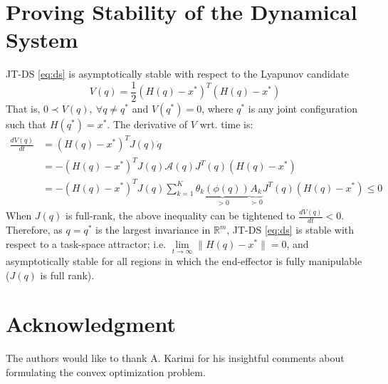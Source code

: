 \documentclass[letterpaper, 10 pt, journal, twoside, fleqn]{IEEEtran}
\begin{document}
{\footnotesize
\appendices
\section{Proving Stability of the Dynamical System}
\label{appendix:stability}
JT-DS \eqref{eq:ds} is asymptotically stable with respect to the Lyapunov candidate
\[ V(q) = \frac{1}{2}(H(q) - x^*)^T(H(q) - x^*) \]
That is, $ 0 \prec V(q),~ \forall q \neq q^*$ and $ V(q^*) = 0 $, where $q^*$ is any joint configuration such that $H(q^*) = x^*$.  The derivative of $ V $ wrt. time is:
\begin{equation}
\begin{aligned}
\frac{dV(q)}{dt} &= (H(q) - x^*)^TJ(q)\dot{q}\\
&= -(H(q) - x^*)^TJ(q)\mathcal{A}(q)J^T(q)(H(q) - x^*)\\
&= -(H(q) - x^*)^TJ(q)\sum_{k=1}^{K}\underbrace{\theta_k(\phi(q))}_{> 0}\underbrace{A_k}_{\succ 0}J^T(q)(H(q) - x^*)\leq 0
\end{aligned}
\end{equation}
When $J(q)$ is full-rank, the above inequality can be tightened to $\frac{dV(q)}{dt} < 0$. Therefore, as $ q=q^* $ is the largest invariance in $ \mathbb{R}^m $, JT-DS \eqref{eq:ds} is stable with respect to a task-space attractor; i.e. $\lim\limits_{t\rightarrow \infty} \| H(q)-x^*\|=0 $, and asymptotically stable for all regions in which the end-effector is fully manipulable ($J(q)$ is full rank).
}
\section*{Acknowledgment}
\footnotesize
The authors would like to thank A. Karimi for his insightful comments about formulating the convex optimization problem.



%



\end{document}
